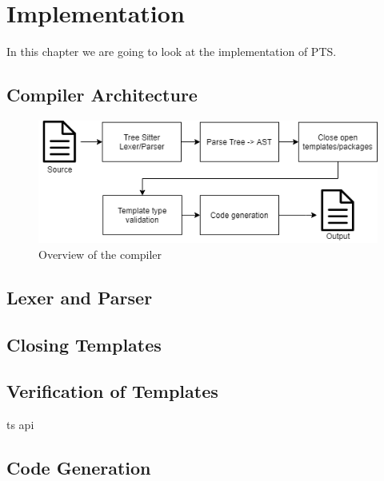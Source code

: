 
\chapter{Implementation}\label{ch:implementation}

In this chapter we are going to look at the implementation of PTS.

\section{Compiler Architecture}\label{sec:architecture}

\begin{figure}
   \centering
   \includegraphics[scale=.75]{images/Compiler overview.png}
   \caption{Overview of the compiler}
   \label{fig:compiler-overview}
\end{figure}

\section{Lexer and Parser}\label{sec:lexer-and-parser}


\section{Closing Templates}\label{sec:closing-templates}


\section{Verification of Templates}\label{sec:verification-of-templates}

ts api

\section{Code Generation}\label{sec:code-generation}

